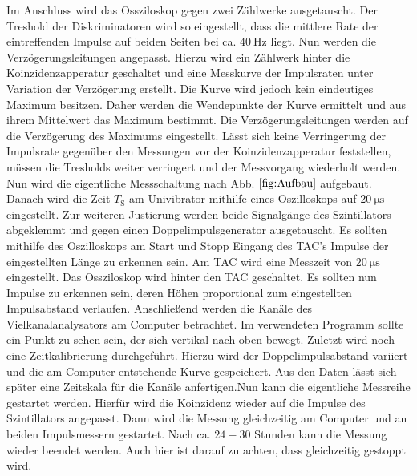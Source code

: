  Im Anschluss wird das Ossziloskop gegen zwei Zählwerke ausgetauscht. Der Treshold der Diskriminatoren wird so eingestellt, dass die mittlere Rate der eintreffenden Impulse auf beiden Seiten bei ca. $\SI{40}{\hertz}$ liegt. Nun werden die Verzögerungsleitungen angepasst. Hierzu wird ein Zählwerk hinter die Koinzidenzapperatur geschaltet und eine Messkurve der Impulsraten unter Variation der Verzögerung erstellt. Die Kurve wird jedoch kein eindeutiges Maximum besitzen. Daher werden die Wendepunkte der Kurve ermittelt und aus ihrem Mittelwert das Maximum bestimmt. Die Verzögerungsleitungen werden auf die Verzögerung des Maximums eingestellt. Lässt sich keine Verringerung der Impulsrate gegenüber den Messungen vor der Koinzidenzapperatur feststellen, müssen die Tresholds weiter verringert und der Messvorgang wiederholt werden. Nun wird die eigentliche Messschaltung nach Abb. $\ref{fig:Aufbau}$ aufgebaut. Danach wird die Zeit $T_\text{S}$ am Univibrator mithilfe eines Oszilloskops auf $\SI{20}{\micro\second}$ eingestellt. Zur weiteren Justierung werden beide Signalgänge des Szintillators abgeklemmt und gegen einen Doppelimpulsgenerator ausgetauscht. Es sollten mithilfe des Oszilloskops am Start und Stopp Eingang des TAC's Impulse der eingestellten Länge zu erkennen sein. Am TAC wird eine Messzeit von $\SI{20}{\micro\second}$ eingestellt. Das Ossziloskop wird hinter den TAC geschaltet. Es sollten nun Impulse zu erkennen sein, deren Höhen proportional zum eingestellten Impulsabstand verlaufen. Anschließend werden die Kanäle des Vielkanalanalysators am Computer betrachtet. Im verwendeten Programm sollte  ein Punkt zu sehen sein, der sich vertikal nach oben bewegt. Zuletzt wird noch eine Zeitkalibrierung durchgeführt. Hierzu wird der Doppelimpulsabstand variiert und die am Computer entstehende Kurve gespeichert. Aus den Daten lässt sich später eine Zeitskala für die Kanäle anfertigen.Nun kann die eigentliche Messreihe gestartet werden. Hierfür wird die Koinzidenz wieder auf die Impulse des Szintillators angepasst. Dann wird die Messung gleichzeitig am Computer und an beiden Impulsmessern gestartet. Nach ca. $24-30$ Stunden kann die Messung wieder beendet werden. Auch hier ist darauf zu achten, dass gleichzeitig gestoppt wird.  